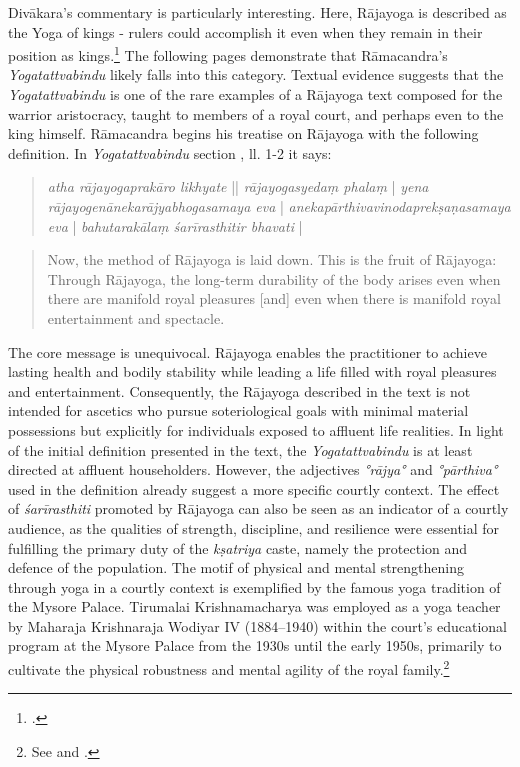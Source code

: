 Divākara's commentary is particularly interesting. Here, Rājayoga is described as the Yoga of kings - rulers could accomplish it even when they remain in their position as kings.\footnote{\citeauthor[2014: 430]{birch2014}.} The following pages demonstrate that Rāmacandra's \emph{Yogatattvabindu} likely falls into this category. Textual evidence suggests that the \textit{Yogatattvabindu} is one of the rare examples of a Rājayoga text composed for the warrior aristocracy, taught to members of a royal court, and perhaps even to the king himself. Rāmacandra begins his treatise on Rājayoga with the following definition. In \emph{Yogatattvabindu} section , ll. 1-2 it says: 
\begin{quote}
\textit{atha rājayogaprakāro likhyate} || \textit{rājayogasyedaṃ phalaṃ} | \textit{yena rājayogenānekarājyabhogasamaya eva} | \textit{anekapārthivavinodaprekṣaṇasamaya eva} | \textit{bahutarakālaṃ śarīrasthitir bhavati} |
  \end{quote}
\begin{quote}
  Now, the method of Rājayoga is laid down. This is the fruit of Rājayoga: Through Rājayoga, the long-term durability of the body arises even when there are manifold royal pleasures [and] even when there is manifold royal entertainment and spectacle.
\end{quote}
The core message is unequivocal. Rājayoga enables the practitioner to achieve lasting health and bodily stability while leading a life filled with royal pleasures and entertainment. Consequently, the Rājayoga described in the text is not intended for ascetics who pursue soteriological goals with minimal material possessions but explicitly for individuals exposed to affluent life realities. In light of the initial definition presented in the text, the \emph{Yogatattvabindu} is at least directed at affluent householders. However, the adjectives \textit{°rājya°} and \textit{°pārthiva°} used in the definition already suggest a more specific courtly context. The effect of \textit{śarīrasthiti} promoted by Rājayoga can also be seen as an indicator of a courtly audience, as the qualities of strength, discipline, and resilience were essential for fulfilling the primary duty of the \textit{kṣatriya} caste, namely the protection and defence of the population. The motif of physical and mental strengthening through yoga in a courtly context is exemplified by the famous yoga tradition of the Mysore Palace. Tirumalai Krishnamacharya was employed as a yoga teacher by Maharaja Krishnaraja Wodiyar IV (1884–1940) within the court's educational program at the Mysore Palace from the 1930s until the early 1950s, primarily to cultivate the physical robustness and mental agility of the royal family.\footnote{See \citeauthor[2010: 177-178]{singleton2010} and \citeauthor[1996: 52-53]{sjoman1996}.}

